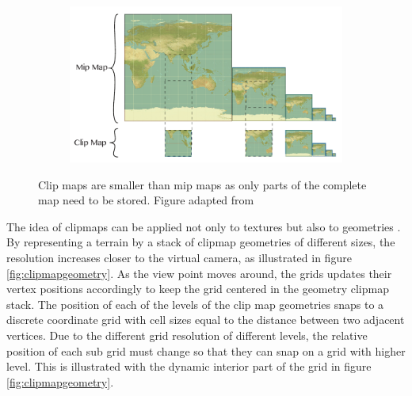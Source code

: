 \begin{figure}[htbp]
    \centering
    \begin{subfigure}[bt]{0.8\textwidth}
        \includegraphics[width=\textwidth]{figures/geometryclipmap/clipmap_mipmap.pdf}
    \end{subfigure}
    \caption{Clip maps are smaller than mip maps as only parts of the complete map need to be stored. Figure adapted from \cite{mapprojections}}
    \label{fig:clipmapmipmap}
\end{figure}

The idea of clipmaps can be applied not only to textures but also to geometries \cite{tanner98}. By representing a terrain by a stack of clipmap geometries of different sizes, the resolution increases closer to the virtual camera, as illustrated in figure \ref{fig:clipmapgeometry}. As the view point moves around, the grids updates their vertex positions accordingly to keep the grid centered in the geometry clipmap stack. The position of each of the levels of the clip map geometries snaps to a discrete coordinate grid with cell sizes equal to the distance between two adjacent vertices. Due to the different grid resolution of different levels, the relative position of each sub grid must change so that they can snap on a grid with higher level. This is illustrated with the dynamic interior part of the grid in figure \ref{fig:clipmapgeometry}.

